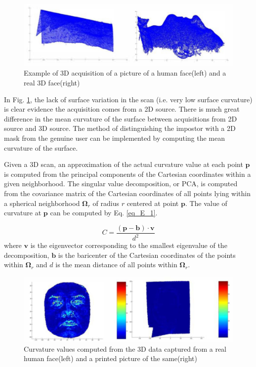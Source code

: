 \documentclass[journal]{IEEEtran}
\begin{document}
\begin{figure}[!t]
\centering
\includegraphics[width=1\linewidth]{img/E_1}
\caption{Example of 3D acquisition of a picture of a human face(left) and a real 3D face(right)}
\label{fig_E_1}
\end{figure}

In Fig. \ref{fig_E_1}, the lack of surface variation in the scan (i.e. very low surface curvature) is clear evidence the acquisition comes from a 2D source. There is much great difference in the mean curvature of the surface between acquisitions from 2D source and 3D source. The method of distinguishing the impostor with a 2D mask from the genuine user can be implemented by computing the mean curvature of the surface.

Given a 3D scan, an approximation of the actual curvature value at each point $\mathbf{p}$ is computed from the principal components of the Cartesian coordinates within a given neighborhood. The singular value decomposition, or PCA, is computed from the covariance matrix of the Cartesian coordinates of all points lying within a spherical neighborhood $\mathbf{\Omega}_r$ of radius $r$ centered at point $\mathbf{p}$. The value of curvature at $\mathbf{p}$ can be computed by Eq. \ref{eq_E_1}.

\begin{equation}
\label{eq_E_1}
C = \frac{\mathbf{(p-b)\cdot v}}{d^2}
\end{equation}
where $\mathbf{v}$ is the eigenvector corresponding to the smallest eigenvalue of the decomposition, $\mathbf{b}$ is the baricenter of the Cartesian coordinates of the points within $\mathbf{\Omega}_r$ and $d$ is the mean distance of all points within $\mathbf{\Omega}_r$.

\begin{figure}[!b]
\centering
\includegraphics[width=1\linewidth]{img/E_2}
\caption{Curvature values computed from the 3D data captured from a real human face(left) and a printed picture of the same(right)}
\label{fig_E_2}
\end{figure}
\end{document}
